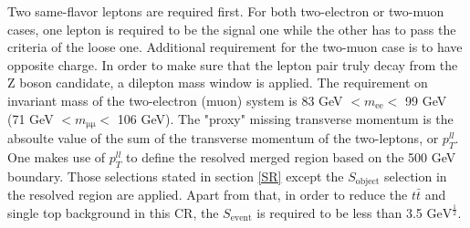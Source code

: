 \documentclass[class=NCU_thesis, crop=false]{standalone}
\begin{document}
		Two same-flavor leptons are required first. For both two-electron or two-muon cases, one lepton is required to be the signal one while the other has to pass the criteria of the loose one. Additional requirement for the two-muon case is to have opposite charge. In order to make sure that the lepton pair truly decay from the Z boson candidate, a dilepton mass window is applied. The requirement on invariant mass of the two-electron (muon) system is 83 GeV $< m_{\mathrm{ee}} <$ 99 GeV (71 GeV $< m_{\mathrm{\mu \mu}} <$ 106 GeV). The "proxy" missing transverse momentum is the absoulte value of the sum of the transverse momentum of the two-leptons, or $p_T^{ll}$. One makes use of $p_T^{ll}$ to define the resolved merged region based on the 500 GeV boundary. Those selections stated in section \ref{SR} except the $S_{\mathrm{object}}$ selection in the resolved region are applied. Apart from that, in order to reduce the $t\bar{t}$ and single top background in this CR, the $S_{\mathrm{event}}$ is required to be less than 3.5 $\mathrm{GeV}^\frac{1}{2}$.
\end{document}
